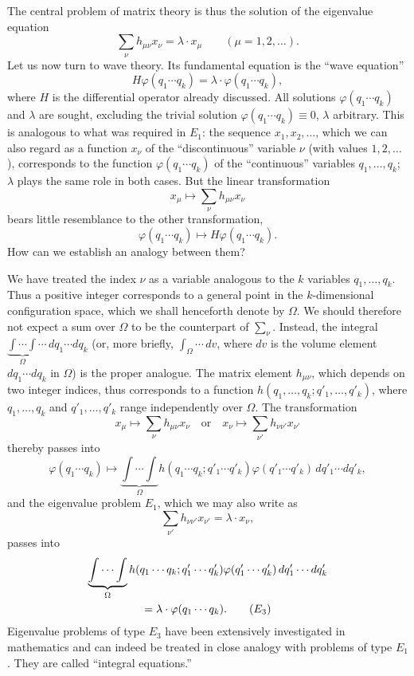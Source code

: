 \documentclass[fontsize=13pt,twoside,openany,headings=normal,parskip=false,bookmarkpackage=false,DIV=calc]{scrbook}
\begin{document}
The central problem of matrix theory is thus the solution of the eigenvalue equation
\begin{equation}
 \sum_\nu h_{\mu\nu}x_\nu=\lambda\cdot x_\mu\qquad(\mu=1,2,\ldots).
 \tag{$E_1$}\label{eq:I.3.E1}
\end{equation}
Let us now turn to wave theory. Its fundamental equation is the ``wave equation''
\begin{equation}
 H\varphi(q_1\cdots q_k)=\lambda\cdot\varphi(q_1\cdots q_k),
 \tag{$E_2$}\label{eq:I.3.E2}
\end{equation}
where $H$ is the differential operator already discussed. All solutions $\varphi(q_1\cdots q_k)$ and $\lambda$ are sought, excluding the trivial solution $\varphi(q_1\cdots q_k)\equiv0$, $\lambda$ arbitrary. This is analogous to what was required in \hyperref[eq:I.3.E1]{$E_1$}: the sequence $x_1,x_2,\ldots$, which we can also regard as a function $x_\nu$ of the ``discontinuous'' variable $\nu$ (with values $1,2,\ldots$), corresponds to the function $\varphi(q_1\cdots q_k)$ of the ``continuous'' variables $q_1,\ldots,q_k$; $\lambda$ plays the same role in both cases. But the linear transformation
\[
 x_\mu\longmapsto\sum_\nu h_{\mu\nu}x_\nu
\]
bears little resemblance to the other transformation,
\[
 \varphi(q_1\cdots q_k)\longmapsto H\varphi(q_1\cdots q_k).
\]
How can we establish an analogy between them?

We have treated the index $\nu$ as a variable analogous to the $k$ variables $q_1,\ldots,q_k$. Thus a positive integer corresponds to a general point in the $k$-dimensional configuration space, which we shall henceforth denote by $\Omega$. We should therefore not expect a sum over $\Omega$ to be the counterpart of $\sum_\nu$. Instead, the integral $\underbrace{\int\cdots\int}_{\Omega}\cdots\,dq_1\cdots dq_k$ (or, more briefly, $\int_\Omega\cdots\,dv$, where $dv$ is the volume element $dq_1\cdots dq_k$ in $\Omega$) is the proper analogue. The matrix element $h_{\mu\nu}$, which depends on two integer indices, thus corresponds to a function $h(q_1,\ldots,q_k;q'_1,\ldots,q'_k)$, where $q_1,\ldots,q_k$ and $q'_1,\ldots,q'_k$ range independently over $\Omega$. The transformation
\[
 x_\mu\longmapsto\sum_\nu h_{\mu\nu}x_\nu
 \quad\text{or}\quad
 x_\nu\longmapsto\sum_{\nu'}h_{\nu\nu'}x_{\nu'}
\]
thereby passes into
\[
 \varphi(q_1\cdots q_k)\longmapsto
 \underbrace{\int\cdots\int}_{\Omega} h(q_1\cdots q_k;q'_1\cdots q'_k)
 \varphi(q'_1\cdots q'_k)\,dq'_1\cdots dq'_k,
\]
and the eigenvalue problem \hyperref[eq:I.3.E1]{$E_1$}, which we may also write as
\[
 \sum_{\nu'}h_{\nu\nu'}x_{\nu'}=\lambda\cdot x_\nu,
\]
passes into
\begin{gather}
 \underbrace{\int\cdots\int}_{\Omega} h(q_1\cdots q_k;q'_1\cdots q'_k)
 \varphi(q'_1\cdots q'_k)\,dq'_1\cdots dq'_k\notag\\
 =\lambda\cdot\varphi(q_1\cdots q_k).
 \tag{$E_3$}\label{eq:I.3.E3}
\end{gather}
\hypertarget{origpage-13}{}%
Eigenvalue problems of type \hyperref[eq:I.3.E3]{$E_3$} have been extensively investigated in mathematics and can indeed be treated in close analogy with problems of type \hyperref[eq:I.3.E1]{$E_1$}. They are called ``integral equations.''
\end{document}
